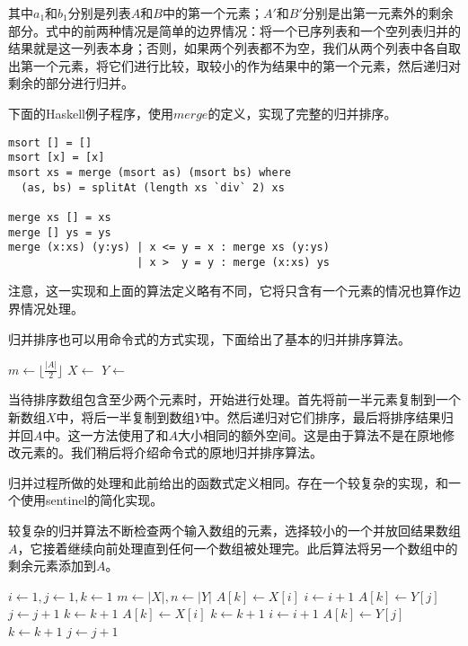 \documentclass[UTF8]{article}
\begin{document}
其中$a_1$和$b_1$分别是列表$A$和$B$中的第一个元素；$A'$和$B'$分别是出第一元素外的剩余部分。式中的前两种情况是简单的边界情况：将一个已序列表和一个空列表归并的结果就是这一列表本身；否则，如果两个列表都不为空，我们从两个列表中各自取出第一个元素，将它们进行比较，取较小的作为结果中的第一个元素，然后递归对剩余的部分进行归并。

下面的Haskell例子程序，使用$merge$的定义，实现了完整的归并排序。

\lstset{language=Haskell}
\begin{lstlisting}[style=Haskell]
msort [] = []
msort [x] = [x]
msort xs = merge (msort as) (msort bs) where
  (as, bs) = splitAt (length xs `div` 2) xs

merge xs [] = xs
merge [] ys = ys
merge (x:xs) (y:ys) | x <= y = x : merge xs (y:ys)
                    | x >  y = y : merge (x:xs) ys
\end{lstlisting}

注意，这一实现和上面的算法定义略有不同，它将只含有一个元素的情况也算作边界情况处理。

归并排序也可以用命令式的方式实现，下面给出了基本的归并排序算法。

\begin{algorithmic}[1]
    \State $m \gets \lfloor \frac{|A|}{2} \rfloor$
    \State $X \gets$ 
    \State $Y \gets$ 
    \State {}
    \State {}
    \State {}
  \EndIf
\EndProcedure
\end{algorithmic}

当待排序数组包含至少两个元素时，开始进行处理。首先将前一半元素复制到一个新数组$X$中，将后一半复制到数组$Y$中。然后递归对它们排序，最后将排序结果归并回$A$中。这一方法使用了和$A$大小相同的额外空间。这是由于算法不是在原地修改元素的。我们稍后将介绍命令式的原地归并排序算法。

归并过程所做的处理和此前给出的函数式定义相同。存在一个较复杂的实现，和一个使用sentinel的简化实现。

较复杂的归并算法不断检查两个输入数组的元素，选择较小的一个并放回结果数组$A$，它接着继续向前处理直到任何一个数组被处理完。此后算法将另一个数组中的剩余元素添加到$A$。

\begin{algorithmic}[1]
  \State $i \gets 1, j\gets 1, k\gets 1$
  \State $m \gets |X|, n \gets |Y|$
      \State $A[k] \gets X[i]$
      \State $i \gets i + 1$
    \Else
      \State $A[k] \gets Y[j]$
      \State $j \gets j + 1$
    \EndIf
    \State $k \gets k + 1$
  \EndWhile
    \State $A[k] \gets X[i]$
    \State $k \gets k + 1$
    \State $i \gets i + 1$
  \EndWhile
    \State $A[k] \gets Y[j]$
    \State $k \gets k + 1$
    \State $j \gets j + 1$
  \EndWhile
\EndProcedure
\end{algorithmic}
\end{document}

